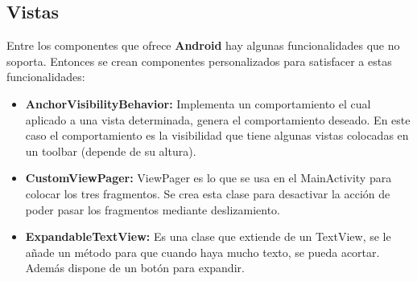 \subsection{Vistas}
\label{makereference4.3.7}
Entre los componentes que ofrece \textbf{Android} hay algunas funcionalidades que no soporta. Entonces se crean componentes personalizados para satisfacer a estas funcionalidades:
\begin{itemize}
    \item \textbf{AnchorVisibilityBehavior:} Implementa un comportamiento el cual aplicado a una vista determinada, genera el comportamiento deseado. En este caso el comportamiento es la visibilidad que tiene algunas vistas colocadas en un toolbar (depende de su altura). 
    \item \textbf{CustomViewPager:} ViewPager es lo que se usa en el MainActivity para colocar los tres fragmentos. Se crea esta clase para desactivar la acción de poder pasar los fragmentos mediante deslizamiento.
    \item \textbf{ExpandableTextView:} Es una clase que extiende de un TextView, se le añade un método para que cuando haya mucho texto, se pueda acortar. Además dispone de un botón para expandir.
\end{itemize} 

